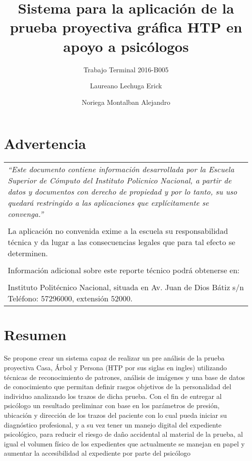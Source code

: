 \documentclass[oneside,12pt]{book}
\title{Sistema para la aplicación de la prueba proyectiva gráfica HTP en apoyo a psicólogos}
\subtitle{Trabajo Terminal 2016-B005}
\author{Laureano Lechuga Erick  \and  \color{authorColor} Noriega Montalban Alejandro}
\begin{document}
\maketitle
\thispagestyle{empty}
\tableofcontents
\chapter*{Advertencia}

\begin{center}
\begin{tabular}{ ||m{33em}|| } 
 \hline
 \hline
 \textit{``Este documento contiene información desarrollada por la Escuela Superior de Cómputo del Instituto Policnico Nacional, a partir de datos y documentos con derecho de propiedad y por lo tanto, su uso quedará restringido a las aplicaciones que explícitamente se convenga.''}\\
 \\
 La aplicación no convenida exime a la escuela su responsabilidad técnica y da lugar a las consecuencias legales que para tal efecto se determinen.\\
 \\
 Información adicional sobre este reporte técnico podrá obtenerse en:\\
 \\
 Instituto Politécnico Nacional, situada en Av. Juan de Dios Bátiz s/n Teléfono: 57296000, extensión 52000.\\ 
 \hline
 \hline
\end{tabular}
\end{center}

 
\chapter*{Resumen}

Se propone crear un sistema capaz de realizar un pre análisis de la prueba proyectiva Casa, Árbol y Persona (HTP por sus siglas en ingles) utilizando técnicas de reconocimiento de patrones, análisis de imágenes y una base de datos de conocimiento que permitan definir rasgos objetivos de la personalidad del individuo analizando los trazos de dicha prueba. Con el fin de entregar al psicólogo un resultado preliminar con base en los parámetros de presión, ubicación y dirección de los trazos del paciente con lo cual pueda iniciar su diagnóstico profesional, y a su vez tener un manejo digital del expediente psicológico, para reducir el riesgo de daño accidental al material de la prueba, al igual el volumen físico de los expedientes que actualmente se manejan en papel y aumentar la accesibilidad al expediente por parte del psicólogo
\end{document}
